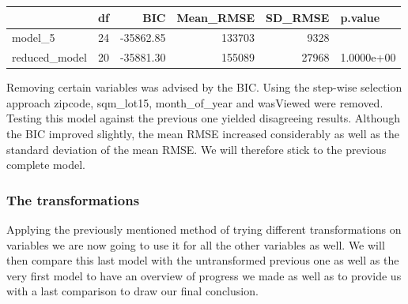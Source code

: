 \documentclass[table]{article}
\begin{document}
\begin{table}[H]
\centering
\begin{tabular}{l|r|r|r|r|l}
\hline
  & df & BIC & Mean\_RMSE & SD\_RMSE & p.value\\
\hline
model\_5 & 24 & -35862.85 & 133703 & 9328 & \\
\hline
reduced\_model & 20 & -35881.30 & 155089 & 27968 & 1.0000e+00\\
\hline
\end{tabular}
\end{table}

\hfill\break
Removing certain variables was advised by the BIC. Using the step-wise
selection approach zipcode, sqm\_lot15, month\_of\_year and wasViewed
were removed. Testing this model against the previous one yielded
disagreeing results. Although the BIC improved slightly, the mean RMSE
increased considerably as well as the standard deviation of the mean
RMSE. We will therefore stick to the previous complete model.

\subsubsection{The transformations}\label{the-transformations}

Applying the previously mentioned method of trying different
transformations on variables we are now going to use it for all the
other variables as well. We will then compare this last model with the
untransformed previous one as well as the very first model to have an
overview of progress we made as well as to provide us with a last
comparison to draw our final conclusion. \hfill\break
\end{document}
